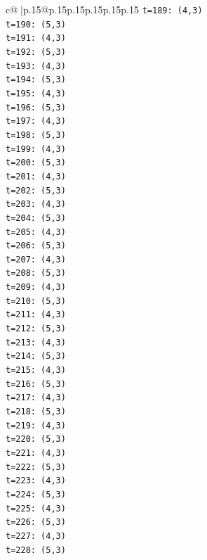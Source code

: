 \documentclass{article}
\begin{document}
{\begin{supertabular}{c@{$\;$}|p{.15\linewidth}@{}p{.15\linewidth}p{.15\linewidth}p{.15\linewidth}p{.15\linewidth}p{.15\linewidth}}
{{{\texttt{t=189: (4,3)} \\
\texttt{t=190: (5,3)} \\
\texttt{t=191: (4,3)} \\
\texttt{t=192: (5,3)} \\
\texttt{t=193: (4,3)} \\
\texttt{t=194: (5,3)} \\
\texttt{t=195: (4,3)} \\
\texttt{t=196: (5,3)} \\
\texttt{t=197: (4,3)} \\
\texttt{t=198: (5,3)} \\
\texttt{t=199: (4,3)} \\
\texttt{t=200: (5,3)} \\
\texttt{t=201: (4,3)} \\
\texttt{t=202: (5,3)} \\
\texttt{t=203: (4,3)} \\
\texttt{t=204: (5,3)} \\
\texttt{t=205: (4,3)} \\
\texttt{t=206: (5,3)} \\
\texttt{t=207: (4,3)} \\
\texttt{t=208: (5,3)} \\
\texttt{t=209: (4,3)} \\
\texttt{t=210: (5,3)} \\
\texttt{t=211: (4,3)} \\
\texttt{t=212: (5,3)} \\
\texttt{t=213: (4,3)} \\
\texttt{t=214: (5,3)} \\
\texttt{t=215: (4,3)} \\
\texttt{t=216: (5,3)} \\
\texttt{t=217: (4,3)} \\
\texttt{t=218: (5,3)} \\
\texttt{t=219: (4,3)} \\
\texttt{t=220: (5,3)} \\
\texttt{t=221: (4,3)} \\
\texttt{t=222: (5,3)} \\
\texttt{t=223: (4,3)} \\
\texttt{t=224: (5,3)} \\
\texttt{t=225: (4,3)} \\
\texttt{t=226: (5,3)} \\
\texttt{t=227: (4,3)} \\
\texttt{t=228: (5,3)} \\
}}}
\end{supertabular}}
\end{document}
